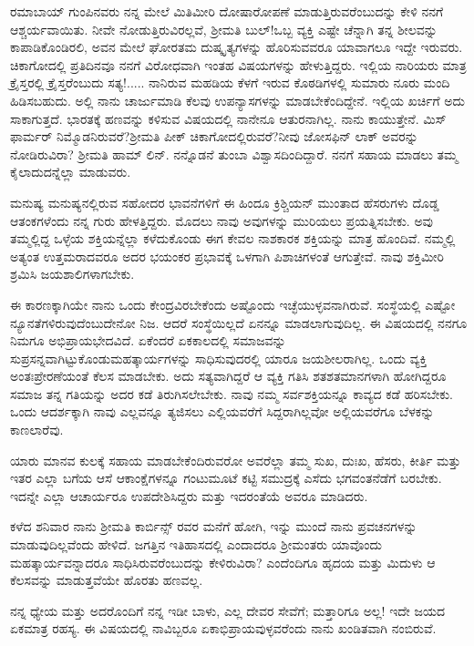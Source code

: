 ರಮಾಬಾಯ್ ಗುಂಪಿನವರು ನನ್ನ ಮೇಲೆ ಮಿತಿಮೀರಿ ದೋಷಾರೋಪಣೆ ಮಾಡುತ್ತಿರುವರೆಂಬುದನ್ನು ಕೇಳಿ ನನಗೆ ಆಶ್ಚರ್ಯವಾಯಿತು. ನೀವೇ ನೋಡುತ್ತಿರುವಿರಲ್ಲವೆ, ಶ‍್ರೀಮತಿ ಬುಲ್!ಒಬ್ಬ ವ್ಯಕ್ತಿ ಎಷ್ಟೇ ಚೆನ್ನಾಗಿ ತನ್ನ ಶೀಲವನ್ನು ಕಾಪಾಡಿಕೊಂಡಿರಲಿ, ಅವನ ಮೇಲೆ ಘೋರತಮ ದುಷ್ಕೃತ್ಯಗಳನ್ನು ಹೊರಿಸುವವರೂ ಯಾವಾಗಲೂ ಇದ್ದೇ ಇರುವರು. ಚಿಕಾಗೋದಲ್ಲಿ ಪ್ರತಿದಿನವೂ ನನಗೆ ವಿರೋಧವಾಗಿ ಇಂತಹ ವಿಷಯಗಳನ್ನು ಹೇಳುತ್ತಿದ್ದರು. ಇಲ್ಲಿಯ ನಾರಿಯರು ಮಾತ್ರ ಕ್ರೈಸ್ತರಲ್ಲಿ ಕ್ರೈಸ್ತರೆಂಬುದು ಸತ್ಯ!..... ನಾನಿರುವ ಮಹಡಿಯ ಕೆಳಗೆ ಇರುವ ಕೊಠಡಿಗಳಲ್ಲಿ ಸುಮಾರು ನೂರು ಮಂದಿ ಹಿಡಿಸಬಹುದು. ಅಲ್ಲಿ ನಾನು ಚಾರ್ಜುಮಾಡಿ ಕೆಲವು ಉಪನ್ಯಾಸಗಳನ್ನು ಮಾಡಬೇಕೆಂದಿದ್ದೇನೆ. ಇಲ್ಲಿಯ ಖರ್ಚಿಗೆ ಅದು ಸಾಕಾಗುತ್ತದೆ. ಭಾರತಕ್ಕೆ ಹಣವನ್ನು ಕಳಿಸುವ ವಿಷಯದಲ್ಲಿ ನಾನೇನೂ ಆತುರನಾಗಿಲ್ಲ. ನಾನು ಕಾಯುತ್ತೇನೆ. ಮಿಸ್ ಫಾರ್ಮರ್ ನಿಮ್ಮೊಡನಿರುವರೆ?ಶ‍್ರೀಮತಿ ಪೀಕ್ ಚಿಕಾಗೋದಲ್ಲಿರುವರೆ?ನೀವು ಜೋಸಫಿನ್ ಲಾಕ್ ಅವರನ್ನು ನೋಡಿರುವಿರಾ? ಶ‍್ರೀಮತಿ ಹಾಮ್ ಲಿನ್. ನನ್ನೊಡನೆ ತುಂಬಾ ವಿಶ್ವಾಸದಿಂದಿದ್ದಾರೆ. ನನಗೆ ಸಹಾಯ ಮಾಡಲು ತಮ್ಮ ಕೈಲಾದುದನ್ನೆಲ್ಲಾ ಮಾಡುವರು.

ಮನುಷ್ಯ ಮನುಷ್ಯನಲ್ಲಿರುವ ಸಹೋದರ ಭಾವನೆಗಳಿಗೆ ಈ ಹಿಂದೂ ಕ್ರಿಶ್ಚಿಯನ್ ಮುಂತಾದ ಹೆಸರುಗಳು ದೊಡ್ಡ ಆತಂಕಗಳೆಂದು ನನ್ನ ಗುರು ಹೇಳತ್ತಿದ್ದರು. ಮೊದಲು ನಾವು ಅವುಗಳನ್ನು ಮುರಿಯಲು ಪ್ರಯತ್ನಿಸಬೇಕು. ಅವು ತಮ್ಮಲ್ಲಿದ್ದ ಒಳ್ಳೆಯ ಶಕ್ತಿಯನ್ನೆಲ್ಲಾ ಕಳೆದುಕೊಂಡು ಈಗ ಕೇವಲ ನಾಶಕಾರಕ ಶಕ್ತಿಯನ್ನು ಮಾತ್ರ ಹೊಂದಿವೆ. ನಮ್ಮಲ್ಲಿ ಅತ್ಯಂತ ಉತ್ತಮರಾದವರೂ ಅದರ ಭಯಂಕರ ಪ್ರಭಾವಕ್ಕೆ ಒಳಗಾಗಿ ಪಿಶಾಚಿಗಳಂತೆ ಆಗುತ್ತೇವೆ. ನಾವು ಶಕ್ತಿಮೀರಿ ಶ್ರಮಿಸಿ ಜಯಶಾಲಿಗಳಾಗಬೇಕು.

ಈ ಕಾರಣಕ್ಕಾಗಿಯೇ ನಾನು ಒಂದು ಕೇಂದ್ರವಿರಬೇಕೆಂದು ಅಷ್ಟೊಂದು ಇಚ್ಛೆಯುಳ್ಳವನಾಗಿರುವೆ. ಸಂಸ್ಥೆಯಲ್ಲಿ ಎಷ್ಟೋ ನ್ಯೂನತೆಗಳಿರುವುದೆಂಬುದೇನೋ ನಿಜ. ಆದರೆ ಸಂಸ್ಥೆಯಿಲ್ಲದೆ ಏನನ್ನೂ ಮಾಡಲಾಗುವುದಿಲ್ಲ. ಈ ವಿಷಯದಲ್ಲಿ ನನಗೂ ನಿಮಗೂ ಅಭಿಪ್ರಾಯಭೇದವಿದೆ. ಏಕೆಂದರೆ ಏಕಕಾಲದಲ್ಲಿ ಸಮಾಜವನ್ನು ಸುಪ್ರಸನ್ನವಾಗಿಟ್ಟುಕೊಂಡು\break ಮಹತ್ಕಾರ್ಯಗಳನ್ನು ಸಾಧಿಸುವುದರಲ್ಲಿ ಯಾರೂ ಜಯಶೀಲರಾಗಿಲ್ಲ. ಒಂದು ವ್ಯಕ್ತಿ ಅಂತಃಪ್ರೇರಣೆಯಂತೆ ಕೆಲಸ ಮಾಡಬೇಕು. ಅದು ಸತ್ಯವಾಗಿದ್ದರೆ ಆ ವ್ಯಕ್ತಿ ಗತಿಸಿ ಶತಶತಮಾನಗಳಾಗಿ ಹೋಗಿದ್ದರೂ ಸಮಾಜ ತನ್ನ ಗತಿಯನ್ನು ಅದರ ಕಡೆ ತಿರುಗಿಸಲೇಬೇಕು. ನಾವು ನಮ್ಮ ಸರ್ವಶಕ್ತಿಯನ್ನೂ ಕಾವ್ಯದ ಕಡೆ ಹರಿಸಬೇಕು. ಒಂದು ಆದರ್ಶಕ್ಕಾಗಿ ನಾವು ಎಲ್ಲವನ್ನೂ ತ್ಯಜಿಸಲು ಎಲ್ಲಿಯವರೆಗೆ ಸಿದ್ದರಾಗಿಲ್ಲವೋ ಅಲ್ಲಿಯವರೆಗೂ ಬೆಳಕನ್ನು ಕಾಣಲಾರೆವು.

ಯಾರು ಮಾನವ ಕುಲಕ್ಕೆ ಸಹಾಯ ಮಾಡಬೇಕೆಂದಿರುವರೋ ಅವರೆಲ್ಲಾ ತಮ್ಮ ಸುಖ, ದುಃಖ, ಹೆಸರು, ಕೀರ್ತಿ ಮತ್ತು ಇತರ ಎಲ್ಲಾ ಬಗೆಯ ಆಸೆ ಆಕಾಂಕ್ಷೆಗಳನ್ನೂ ಗಂಟುಮೂಟೆ ಕಟ್ಟಿ ಸಮುದ್ರಕ್ಕೆ ಎಸೆದು ಭಗವಂತನೆಡೆಗೆ ಬರಬೇಕು. ಇದನ್ನೇ ಎಲ್ಲಾ ಆಚಾರ್ಯರೂ ಉಪದೇಶಿಸಿದ್ದರು ಮತ್ತು ಇದರಂತೆಯೆ ಅವರೂ ಮಾಡಿದರು.

\eject

ಕಳೆದ ಶನಿವಾರ ನಾನು ಶ‍್ರೀಮತಿ ಕಾರ್ಬಿನ್ಸ್ ರವರ ಮನೆಗೆ ಹೋಗಿ, ಇನ್ನು ಮುಂದೆ ನಾನು ಪ್ರವಚನಗಳನ್ನು ಮಾಡುವುದಿಲ್ಲವೆಂದು ಹೇಳಿದೆ. ಜಗತ್ತಿನ ಇತಿಹಾಸದಲ್ಲಿ ಎಂದಾದರೂ ಶ‍್ರೀಮಂತರು ಯಾವೊಂದು ಮಹತ್ಕಾರ್ಯವನ್ನಾದರೂ ಸಾಧಿಸಿರುವರೆಂಬುದನ್ನು ಕೇಳಿರುವಿರಾ? ಎಂದೆಂದಿಗೂ ಹೃದಯ ಮತ್ತು ಮಿದುಳು ಆ ಕೆಲಸವನ್ನು ಮಾಡುತ್ತವೆಯೇ ಹೊರತು ಹಣವಲ್ಲ.

ನನ್ನ ಧ್ಯೇಯ ಮತ್ತು ಅದರೊಂದಿಗೆ ನನ್ನ ಇಡೀ ಬಾಳು, ಎಲ್ಲ ದೇವರ ಸೇವೆಗೆ; ಮತ್ತಾರಿಗೂ ಅಲ್ಲ! ಇದೇ ಜಯದ ಏಕಮಾತ್ರ ರಹಸ್ಯ. ಈ ವಿಷಯದಲ್ಲಿ ನಾವಿಬ್ಬರೂ ಏಕಾಭಿಪ್ರಾಯವುಳ್ಳವರೆಂದು ನಾನು ಖಂಡಿತವಾಗಿ ನಂಬಿರುವೆ.

